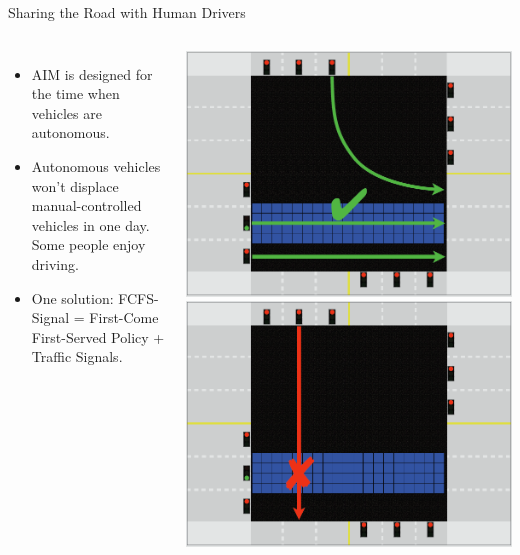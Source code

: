 \documentclass{beamer}
\begin{document}
\begin{frame}{Sharing the Road with Human Drivers}
\begin{columns}[c]
\begin{itemize}
\item AIM is designed for the time when vehicles are autonomous.
\item Autonomous vehicles won't displace manual-controlled vehicles in
one day. Some people enjoy driving.\pause
\item One solution: FCFS-Signal = First-Come First-Served Policy +
Traffic Signals.
\end{itemize}
\includegraphics[width=\textwidth]{fcfs-light-1.png}
\hfill
\includegraphics[width=\textwidth]{fcfs-light-2.png}
\end{columns}
\end{frame}
\end{document}
